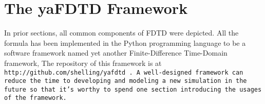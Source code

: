 \section{The yaFDTD Framework}

In prior sections, all common components of FDTD were depicted. All the formula has been implemented in the Python programming
language to be a software framework named yet another Finite-Difference Time-Domain framework, The repository of this
framework is at \tt http://github.com/shelling/yafdtd \rm. A well-designed framework can reduce the time to developing and
modeling a new simulation in the future so that it's worthy to spend one section introducing the usages of the
framework.
